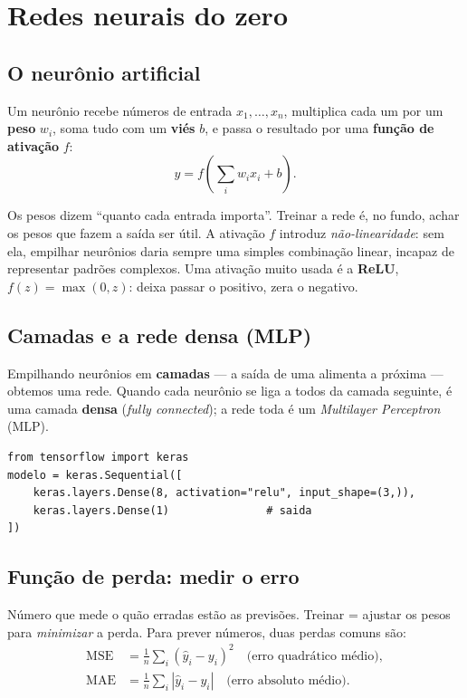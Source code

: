 \section{Redes neurais do zero}
\label{sec:nn}

\subsection{O neurônio artificial}
\begin{definicao}[Neurônio]
Um neurônio recebe números de entrada $x_1,\dots,x_n$, multiplica cada um por um
\textbf{peso} $w_i$, soma tudo com um \textbf{viés} $b$, e passa o resultado por
uma \textbf{função de ativação} $f$:
\[
y = f\!\left(\textstyle\sum_i w_i x_i + b\right).
\]
\end{definicao}

\begin{intuicao}
Os pesos dizem ``quanto cada entrada importa''. Treinar a rede é, no fundo, achar
os pesos que fazem a saída ser útil. A ativação $f$ introduz
\emph{não-linearidade}: sem ela, empilhar neurônios daria sempre uma simples
combinação linear, incapaz de representar padrões complexos. Uma ativação muito
usada é a \textbf{ReLU}, $f(z)=\max(0,z)$: deixa passar o positivo, zera o
negativo.
\end{intuicao}

\subsection{Camadas e a rede densa (MLP)}
Empilhando neurônios em \textbf{camadas} --- a saída de uma alimenta a próxima ---
obtemos uma rede. Quando cada neurônio se liga a todos da camada seguinte, é uma
camada \textbf{densa} (\emph{fully connected}); a rede toda é um \emph{Multilayer
Perceptron} (MLP).

\begin{lstlisting}[caption={Uma MLP minúscula em Keras (só para fixar a ideia).}]
from tensorflow import keras
modelo = keras.Sequential([
    keras.layers.Dense(8, activation="relu", input_shape=(3,)),
    keras.layers.Dense(1)               # saida
])
\end{lstlisting}

\subsection{Função de perda: medir o erro}
\begin{definicao}
Número que mede o quão erradas estão as previsões. Treinar = ajustar os pesos
para \emph{minimizar} a perda. Para prever números, duas perdas comuns são:
\begin{align*}
\text{MSE} &= \frac{1}{n}\sum_i (\hat{y}_i - y_i)^2 \quad\text{(erro quadrático médio)},\\
\text{MAE} &= \frac{1}{n}\sum_i |\hat{y}_i - y_i| \quad\text{(erro absoluto médio)}.
\end{align*}
\end{definicao}

